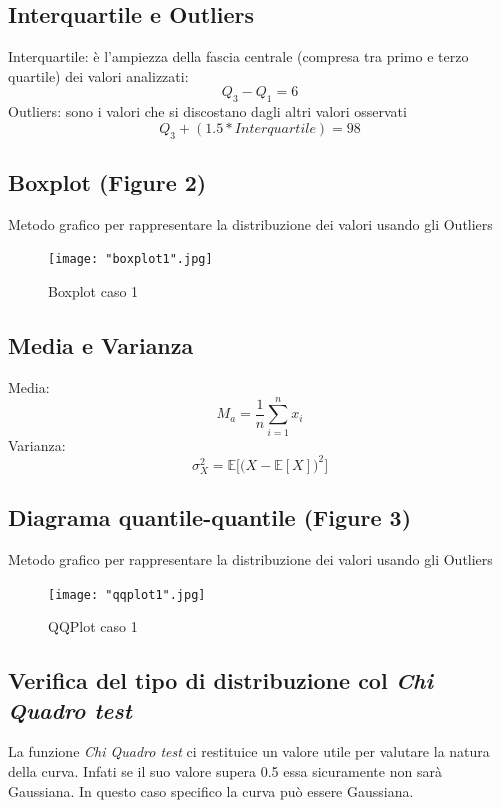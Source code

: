 \documentclass[a4paper]{article}
\begin{document}
\subsection{Interquartile e Outliers}
Interquartile: è l'ampiezza della fascia centrale (compresa tra primo e terzo quartile) dei valori analizzati:
\begin{equation}
	Q_3-Q_1=6
\end{equation}
Outliers: sono i valori che si discostano dagli altri valori osservati
\begin{equation}
	Q_3+(1.5*Interquartile)=98
\end{equation}

\subsection{Boxplot (Figure 2)}
Metodo grafico per rappresentare la distribuzione dei valori usando gli Outliers
\begin{figure}[htp]
	\centering
	\texttt{[image: "boxplot1".jpg]}
	\caption{Boxplot caso 1}
	\label{}
\end{figure}

\subsection{Media e Varianza}
Media: 
\begin{equation}
	M_{a}={\frac  {1}{n}}\sum _{{i=1}}^{n}x_{i}
\end{equation}
Varianza: 
\begin{equation}
	\sigma _{X}^{2}={\mathbb  {E}}{\Big [}{\big (}X-{\mathbb  {E}}[X]{\big )}^{2}{\Big ]}
\end{equation}
\subsection{Diagrama quantile-quantile (Figure 3)}
Metodo grafico per rappresentare la distribuzione dei valori usando gli Outliers
\begin{figure}[htp]
	\centering
	\texttt{[image: "qqplot1".jpg]}
	\caption{QQPlot caso 1}
	\label{}
\end{figure}

\subsection{Verifica del tipo di distribuzione col \emph{Chi Quadro test}}
La funzione \emph{Chi Quadro test} ci restituice un valore utile per valutare la natura della curva. Infati se il suo valore supera 0.5 essa sicuramente non sarà Gaussiana. In questo caso specifico la curva può essere Gaussiana.
\end{document}
